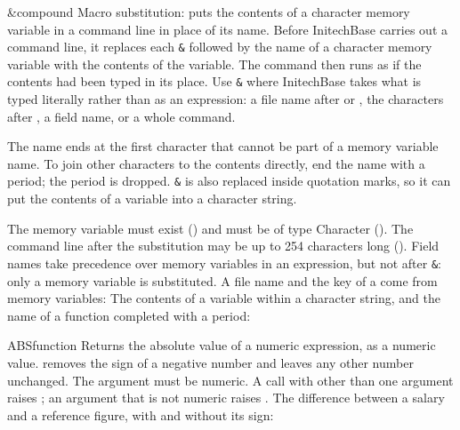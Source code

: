 \begin{XbaseEntry}{\&}{compound}\XAlso{&}{\&}%
Macro substitution: puts the contents of a character memory variable in a
command line in place of its name.
\Syntax
{}
\Usage
Before InitechBase carries out a command line, it replaces each \texttt{\&}
followed by the name of a character memory variable with the contents of the
variable.  The command then runs as if the contents had been typed in its
place.  Use \texttt{\&} where InitechBase takes what is typed literally rather
than as an expression: a file name after  or , the
characters after , a field name, or a whole command.

The name ends at the first character that cannot be part of a memory variable
name.  To join other characters to the contents directly, end the name with a
period; the period is dropped.  \texttt{\&} is also replaced inside quotation
marks, so it can put the contents of a variable into a character string.

The memory variable must exist () and must be of
type Character ().  The command line after the
substitution may be up to 254 characters long
().
\Tips
Field names take precedence over memory variables in an expression, but not
after \texttt{\&}: only a memory variable is substituted.
\Examples
A file name and the key of a  come from memory variables:
The contents of a variable within a character string, and the name of a
function completed with a period:
\end{XbaseEntry}

\begin{XbaseEntry}{ABS}{function}
Returns the absolute value of a numeric expression, as a numeric value.
\Syntax
{}
\Usage
{} removes the sign of a negative number and leaves any other number unchanged. The argument must be numeric. A call with other than one argument raises ; an argument that is not numeric raises .
\Examples
The difference between a salary and a reference figure, with and without its sign:
\end{XbaseEntry}

